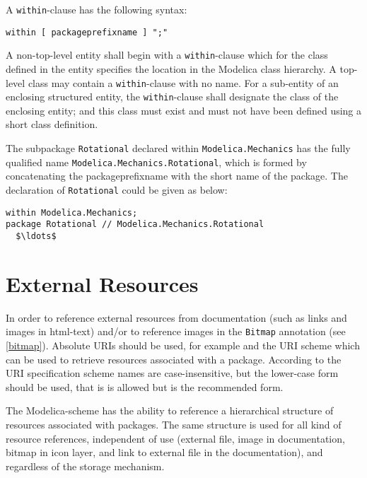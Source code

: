 A \lstinline!within!-clause has the following syntax:
\begin{lstlisting}[language=grammar]
  within [ packageprefixname ] ";"
\end{lstlisting}%
A non-top-level entity shall begin with a \lstinline!within!-clause which for the class defined in the entity specifies the location in the Modelica class hierarchy.
A top-level class may contain a \lstinline!within!-clause with no name.
For a sub-entity of an enclosing structured entity, the \lstinline!within!-clause shall designate the class of the enclosing entity; and this class must exist and must not have been defined using a short class definition.

\begin{example}
The subpackage \lstinline!Rotational! declared within
\lstinline!Modelica.Mechanics! has the fully qualified name
\lstinline!Modelica.Mechanics.Rotational!, which is formed by concatenating
the packageprefixname with the short name of the package. The
declaration of \lstinline!Rotational! could be given as below:
\begin{lstlisting}[language=modelica]
within Modelica.Mechanics;
package Rotational // Modelica.Mechanics.Rotational
  $\ldots$
\end{lstlisting}
\end{example}

\section{External Resources}\label{external-resources}

In order to reference external resources from documentation (such as links and images in html-text) and/or to reference images in the \lstinline!Bitmap! annotation (see \cref{bitmap}).
Absolute URIs should be used, for example  and the URI scheme  which can be used to retrieve resources associated with a package.
According to the URI specification scheme names are case-insensitive, but the lower-case form should be used, that is  is allowed but  is the recommended form.

The Modelica-scheme has the ability to reference a hierarchical structure of resources associated with packages.
The same structure is used for all kind of resource references, independent of use (external file, image in documentation, bitmap in icon layer, and link to external file in the documentation), and regardless of the storage mechanism.

